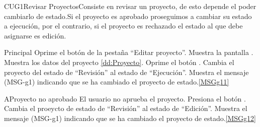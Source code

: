
\begin{UseCase}{CUG1}{Revisar Proyectos}{Consiste en revisar un proyecto, de esto depende el poder cambiarlo de estado.Si el proyecto es aprobado proseguimos a cambiar su estado a ejecución, por el contrario, si el proyecto es rechazado el estado al que debe asignarse es edición.}
\end{UseCase}
	
	
\begin{UCtrayectoria}{Principal}
		\UCpaso[\UCactor] Oprime el botón  de la pestaña ``Editar proyecto''.
		\UCpaso Muestra la pantalla .
		\UCpaso Muestra los datos del proyecto \ref{dd:Proyecto}.
		\UCpaso[\UCactor] Oprime el botón . 
		\UCpaso Cambia el proyecto del estado de ``Revisión'' al estado de ``Ejecución''.
		\UCpaso Muestra el mensaje (MSG-g1) indicando que se ha cambiado el proyecto de estado.\ref{MSGg11}
\end{UCtrayectoria}

\begin{UCtrayectoriaA}{A}{Proyecto no aprobado }{El usuario no aprueba el proyecto.}
			\UCpaso[\UCactor] Presiona el botón .
			\UCpaso Cambia el proeycto de estado de ``Revisión'' al estado de ``Edición''.
			\UCpaso Muestra el mensaje (MSG-g1) indicando que se ha cambiado el proyecto de estado.\ref{MSGg12}
\end{UCtrayectoriaA}


